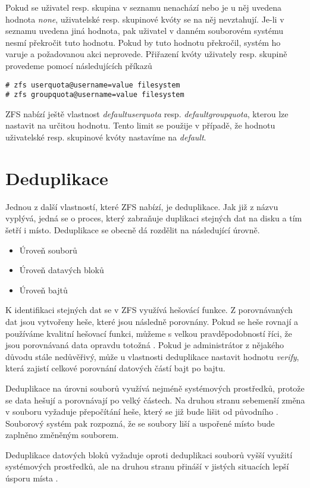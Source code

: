 Pokud se uživatel resp. skupina v seznamu nenachází nebo je u něj uvedena hodnota \emph{none}, uživatelské resp. skupinové kvóty se na něj nevztahují. Je-li v seznamu uvedena jiná hodnota, pak uživatel v danném souborovém systému nesmí překročit tuto hodnotu. Pokud by tuto hodnotu překročil, systém ho varuje a požadovanou akci neprovede. Přiřazení kvóty uživately resp. skupině provedeme pomocí následujících příkazů
\begin{verbatim}
# zfs userquota@username=value filesystem
# zfs groupquota@username=value filesystem
\end{verbatim}

ZFS nabízí ještě vlastnost \emph{defaultuserquota} resp. \emph{defaultgroupquota}, kterou lze nastavit na určitou hodnotu. Tento limit se použije v případě, že hodnotu uživatelské resp. skupinové kvóty nastavíme na \emph{default}.
\section{Deduplikace}
\label{dedup}
Jednou z další vlastností, které ZFS nabízí, je deduplikace. Jak již z názvu vyplývá, jedná se o proces, který zabraňuje duplikaci stejných dat na disku a tím šetří i místo. Deduplikace se obecně dá rozdělit na následující úrovně.
\begin{itemize}
  \item Úroveň souborů
  \item Úroveň datavých bloků
  \item Úroveň bajtů
\end{itemize}

K identifikaci stejných dat se v ZFS využívá hešovácí funkce. Z porovnávaných dat jsou vytvořeny heše, které jsou následně porovnány. Pokud se heše rovnají a používáme kvalitní hešovací funkci, můžeme s velkou pravděpodobností říci, že jsou porovnávaná data opravdu totožná \cite{dedup}. Pokud je administrátor z nějakého důvodu stále nedůvěřivý, může u vlastnosti deduplikace nastavit hodnotu \emph{verify}, která zajistí celkové porovnání datových částí bajt po bajtu.

Deduplikace na úrovni souborů využívá nejméně systémových prostředků, protože se data hešují a porovnávají po velký částech. Na druhou stranu sebemenší změna v souboru vyžaduje přepočítání heše, který se již bude lišit od původního \cite{dedup}. Souborový systém pak rozpozná, že se soubory liší a uspořené místo bude zaplněno změněným souborem.

Deduplikace datových bloků vyžaduje oproti deduplikaci souborů vyšší využití systémových prostředků, ale na druhou stranu přináší v jistých situacích lepší úsporu místa \cite{dedup}.

